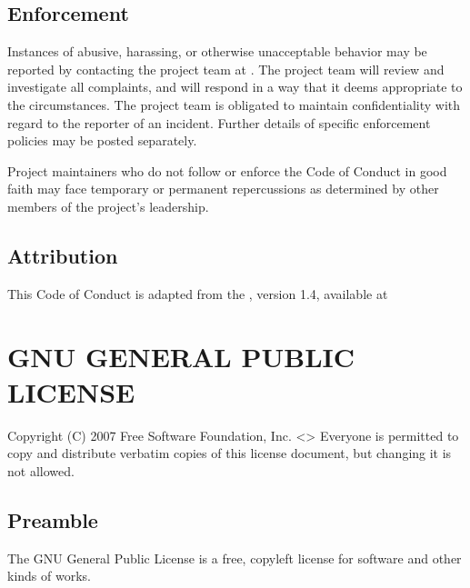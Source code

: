 \documentclass[letterpaper,10pt,english]{sphinxmanual}
\begin{document}
\section{Enforcement}
\label{\detokenize{contribute/codeconduct:enforcement}}
\sphinxAtStartPar
Instances of abusive, harassing, or otherwise unacceptable behavior may be reported by contacting the project team at . The project team will review and investigate all complaints, and will respond in a way that it deems appropriate to the circumstances. The project team is obligated to maintain confidentiality with regard to the reporter of an incident. Further details of specific enforcement policies may be posted separately.

\sphinxAtStartPar
Project maintainers who do not follow or enforce the Code of Conduct in good faith may face temporary or permanent repercussions as determined by other members of the project’s leadership.


\section{Attribution}
\label{\detokenize{contribute/codeconduct:attribution}}
\sphinxAtStartPar
This Code of Conduct is adapted from the  , version 1.4, available at 


\chapter{GNU GENERAL PUBLIC LICENSE}
\label{\detokenize{license:gnu-general-public-license}}\label{\detokenize{license::doc}}
\sphinxAtStartPar
{}

\sphinxAtStartPar
Copyright (C) 2007 Free Software Foundation, Inc. \textless{}\textgreater{}
Everyone is permitted to copy and distribute verbatim copies of this license document, but changing it is not allowed.


\section{Preamble}
\label{\detokenize{license:preamble}}
\sphinxAtStartPar
The GNU General Public License is a free, copyleft license for software and other kinds of works.
\end{document}
